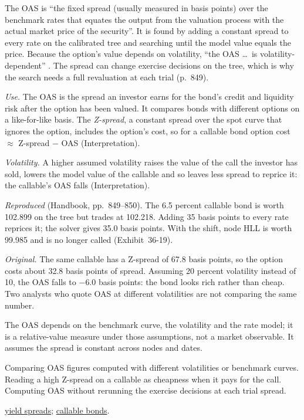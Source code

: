 \begin{qfmethod}\label{meth:option-adjusted-spread}
 The OAS is ``the fixed spread (usually measured in basis points) over the benchmark rates that equates the output from the valuation process with the actual market price of the security''. It is found by adding a constant spread to every rate on the calibrated tree and searching until the model value equals the price. Because the option's value depends on volatility, ``the OAS \dots\ is volatility-dependent'' \citep[chap.~36, pp.~849--850]{s7-fabozzifixed}. The spread can change exercise decisions on the tree, which is why the search needs a full revaluation at each trial (p.~849).

\emph{Use.} The OAS is the spread an investor earns for the bond's credit and liquidity risk after the option has been valued. It compares bonds with different options on a like-for-like basis. The \emph{Z-spread}, a constant spread over the spot curve that ignores the option, includes the option's cost, so for a callable bond option cost $\approx$ Z-spread $-$ OAS (Interpretation).

\emph{Volatility.} A higher assumed volatility raises the value of the call the investor has sold, lowers the model value of the callable and so leaves less spread to reprice it: the callable's OAS falls (Interpretation).

 \emph{Reproduced} (Handbook, pp.~849--850). The 6.5 percent callable bond is worth 102.899 on the tree but trades at 102.218. Adding 35 basis points to every rate reprices it; the solver gives 35.0 basis points. With the shift, node HLL is worth 99.985 and is no longer called (Exhibit~36-19).

\emph{Original.} The same callable has a Z-spread of 67.8 basis points, so the option costs about 32.8 basis points of spread. Assuming 20 percent volatility instead of 10, the OAS falls to $-6.0$ basis points: the bond looks rich rather than cheap. Two analysts who quote OAS at different volatilities are not comparing the same number.

 The OAS depends on the benchmark curve, the volatility and the rate model; it is a relative-value measure under those assumptions, not a market observable. It assumes the spread is constant across nodes and dates.

 Comparing OAS figures computed with different volatilities or benchmark curves. Reading a high Z-spread on a callable as cheapness when it pays for the call. Computing OAS without rerunning the exercise decisions at each trial spread.

 \hyperref[def:bond-yield-spread-measures]{yield spreads}; \hyperref[meth:callable-putable-bond-valuation]{callable bonds}.

\end{qfmethod}

